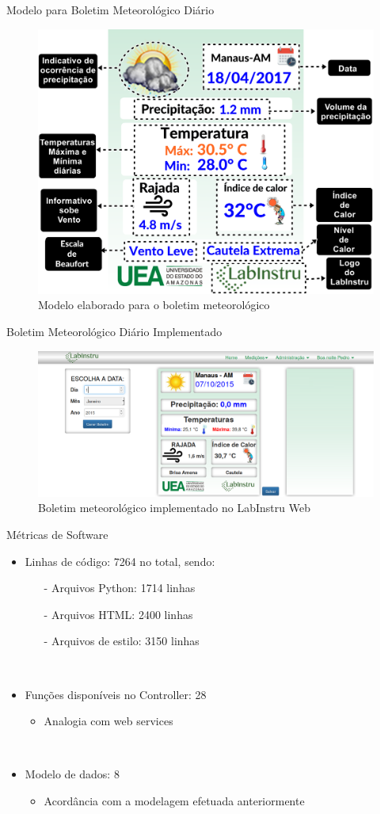 \begin{frame}{Modelo para Boletim Meteorológico Diário}
\begin{figure}[h!]
\centering
\includegraphics[width=0.5\linewidth]{./img/esbocoBoletim}
\caption{Modelo elaborado para o boletim meteorológico} \label{fig:modeloBoletim}
\end{figure}
\end{frame}

\begin{frame}{Boletim Meteorológico Diário Implementado}
\begin{figure}[h!]
\centering
\includegraphics[width=0.7\linewidth]{./img/boletim}
\caption{Boletim meteorológico implementado no LabInstru Web} \label{fig:boletim}
\end{figure}
\end{frame}

\begin{frame}{Métricas de Software}
\begin{itemize}
\item Linhas de código: 7264 no total, sendo:
\begin{itemize}
\item[-] Arquivos Python: 1714 linhas
\item[-] Arquivos HTML: 2400 linhas
\item[-] Arquivos de estilo: 3150 linhas
\end{itemize}
\ \ \newline
\item Funções disponíveis no Controller: 28
\begin{itemize}
	\item Analogia com web services
\end{itemize}
\ \ \newline
\item Modelo de dados: 8
\begin{itemize}
	\item Acordância com a modelagem efetuada anteriormente
\end{itemize}
\end{itemize}
\end{frame}


